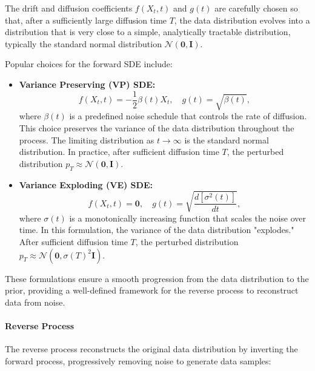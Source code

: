 \begin{itemize}
The drift and diffusion coefficients \( f(X_t, t) \) and \( g(t) \) are carefully chosen so that, after a sufficiently large diffusion time \( T \), the data distribution evolves into a distribution that is very close to a simple, analytically tractable distribution, typically the standard normal distribution \( \mathcal{N}(\mathbf{0}, \mathbf{I}) \).

Popular choices for the forward SDE include: 

    
\begin{itemize}
    \item \textbf{Variance Preserving (VP) SDE:}
    \[
    f(X_t, t) = -\frac{1}{2} \beta(t) X_t, \quad g(t) = \sqrt{\beta(t)},
    \]
    where \( \beta(t) \) is a predefined noise schedule that controls the rate of diffusion. This choice preserves the variance of the data distribution throughout the process. The limiting distribution as \( t \to \infty \) is the standard normal distribution. In practice, after sufficient diffusion time \( T \), the perturbed distribution \( p_T \approx \mathcal{N}(\mathbf{0}, \mathbf{I}) \).
    
    \item \textbf{Variance Exploding (VE) SDE:}
    \[
    f(X_t, t) = \mathbf{0}, \quad g(t) = \sqrt{\frac{d[\sigma^2(t)]}{dt}},
    \]
    where \( \sigma(t) \) is a monotonically increasing function that scales the noise over time. In this formulation, the variance of the data distribution "explodes." After sufficient diffusion time \( T \), the perturbed distribution \( p_T \approx \mathcal{N}(\mathbf{0}, \sigma(T)^2 \mathbf{I}) \).
\end{itemize}

\end{itemize}

These formulations ensure a smooth progression from the data distribution to the prior, providing a well-defined framework for the reverse process to reconstruct data from noise.


\paragraph{Reverse Process}

The reverse process reconstructs the original data distribution by inverting the forward process, progressively removing noise to generate data samples:


